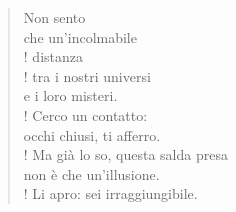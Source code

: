 
\begin{verse}
Non sento\\
che un'incolmabile\\!
distanza\\!
tra i nostri universi\\
e i loro misteri.\\!
Cerco un contatto:\\
occhi chiusi, ti afferro.\\!
Ma già lo so, questa salda presa\\
non è che un'illusione.\\!
Li apro: sei irraggiungibile.

\end{verse}